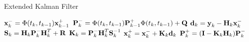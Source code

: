 \begin{algorithm}[!ht]
\caption{Extended Kalman Filter}\label{alg:EKF}
\begin{algorithmic}[1]
\State $\mathrm{\textbf{x}}_k^- = \Phi(t_k,t_{k-1})\mathrm{\textbf{x}}_{k-1}^+$ 
\State $\mathrm{\textbf{P}}_k^- = \Phi(t_k,t_{k-1})\mathrm{\textbf{P}}_{k-1}^+\Phi(t_k,t_{k-1}) + \mathrm{\textbf{Q}}$ 
\State $\mathrm{\textbf{d}}_k = \mathrm{\textbf{y}}_k - \mathrm{\textbf{H}}_k\mathrm{\textbf{x}}_{k}^-$ 
\State $\mathrm{\textbf{S}}_k = \mathrm{\textbf{H}}_k \mathrm{\textbf{P}}_k^- \mathrm{\textbf{H}}_k^T + \mathrm{\textbf{R}}$
\State $\mathrm{\textbf{K}}_k = \mathrm{\textbf{P}}_k^- \mathrm{\textbf{H}}_k^T \mathrm{\textbf{S}}_k^{-1}$ 
\State $\mathrm{\textbf{x}}_k^+ = \mathrm{\textbf{x}}_k^- + \mathrm{\textbf{K}}_k\mathrm{\textbf{d}}_k$ \label{lst:update}
\State $\mathrm{\textbf{P}}_k^+ = (\mathrm{\textbf{I}} - \mathrm{\textbf{K}}_k\mathrm{\textbf{H}}_k)\mathrm{\textbf{P}}_k^-$
\end{algorithmic}
\end{algorithm}

